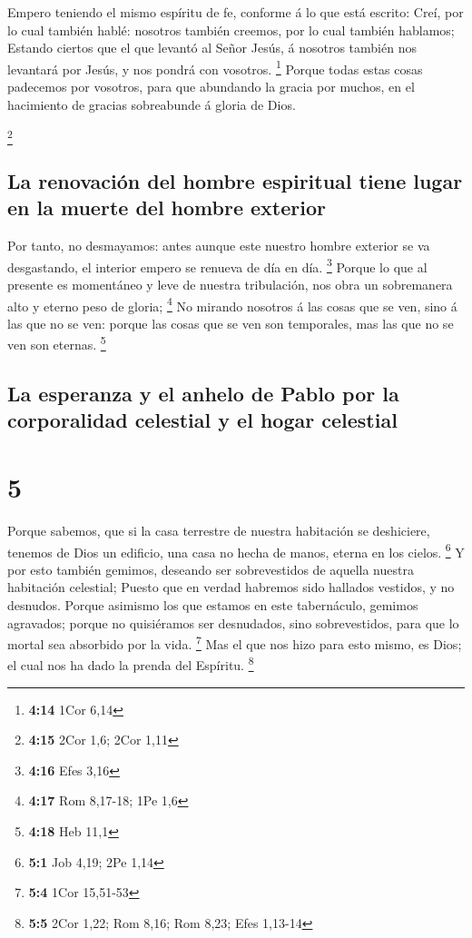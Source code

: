  Empero teniendo el mismo espíritu de fe, conforme á lo que
está escrito: Creí, por lo cual también hablé: nosotros también creemos,
por lo cual también hablamos;  Estando ciertos que el que
levantó al Señor Jesús, á nosotros también nos levantará por Jesús, y
nos pondrá con vosotros. \footnote{\textbf{4:14} 1Cor 6,14}
 Porque todas estas cosas padecemos por vosotros, para que
abundando la gracia por muchos, en el hacimiento de gracias sobreabunde
á gloria de Dios.

\footnote{\textbf{4:15} 2Cor 1,6; 2Cor 1,11}

\hypertarget{la-renovaciuxf3n-del-hombre-espiritual-tiene-lugar-en-la-muerte-del-hombre-exterior}{%
\subsection{La renovación del hombre espiritual tiene lugar en la muerte
del hombre
exterior}\label{la-renovaciuxf3n-del-hombre-espiritual-tiene-lugar-en-la-muerte-del-hombre-exterior}}

 Por tanto, no desmayamos: antes aunque este nuestro hombre
exterior se va desgastando, el interior empero se renueva de día en día.
\footnote{\textbf{4:16} Efes 3,16}  Porque lo que al
presente es momentáneo y leve de nuestra tribulación, nos obra un
sobremanera alto y eterno peso de gloria; \footnote{\textbf{4:17} Rom
  8,17-18; 1Pe 1,6}  No mirando nosotros á las cosas que se
ven, sino á las que no se ven: porque las cosas que se ven son
temporales, mas las que no se ven son eternas. \footnote{\textbf{4:18}
  Heb 11,1}

\hypertarget{la-esperanza-y-el-anhelo-de-pablo-por-la-corporalidad-celestial-y-el-hogar-celestial}{%
\subsection{La esperanza y el anhelo de Pablo por la corporalidad
celestial y el hogar
celestial}\label{la-esperanza-y-el-anhelo-de-pablo-por-la-corporalidad-celestial-y-el-hogar-celestial}}

\hypertarget{section-4}{%
\section{5}\label{section-4}}

 Porque sabemos, que si la casa terrestre de nuestra
habitación se deshiciere, tenemos de Dios un edificio, una casa no hecha
de manos, eterna en los cielos. \footnote{\textbf{5:1} Job 4,19; 2Pe
  1,14}  Y por esto también gemimos, deseando ser
sobrevestidos de aquella nuestra habitación celestial; 
Puesto que en verdad habremos sido hallados vestidos, y no desnudos.
 Porque asimismo los que estamos en este tabernáculo,
gemimos agravados; porque no quisiéramos ser desnudados, sino
sobrevestidos, para que lo mortal sea absorbido por la vida. \footnote{\textbf{5:4}
  1Cor 15,51-53}  Mas el que nos hizo para esto mismo, es
Dios; el cual nos ha dado la prenda del Espíritu. \footnote{\textbf{5:5}
  2Cor 1,22; Rom 8,16; Rom 8,23; Efes 1,13-14}

